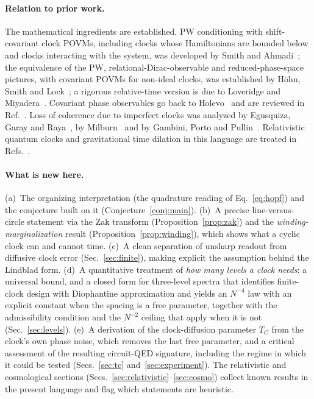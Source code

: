 \documentclass[aps,prd,onecolumn,notitlepage,10pt,amsmath,amssymb,amsfonts,nofootinbib]{revtex4-2}
\theoremstyle{definition}
\theoremstyle{remark}
\begin{document}
\paragraph*{Relation to prior work.}
The mathematical ingredients are established. PW conditioning with shift-covariant clock POVMs, including clocks whose Hamiltonians are bounded below and clocks interacting with the system, was developed by Smith and Ahmadi~\cite{SmithAhmadi2019}; the equivalence of the PW, relational-Dirac-observable and reduced-phase-space pictures, with covariant POVMs for non-ideal clocks, was established by H\"ohn, Smith and Lock~\cite{Hohn2021}; a rigorous relative-time version is due to Loveridge and Miyadera~\cite{LoveridgeMiyadera2019}. Covariant phase observables go back to Holevo~\cite{Holevo1982} and are reviewed in Ref.~\cite{BuschGrabowskiLahti1995}. Loss of coherence due to imperfect clocks was analyzed by Egusquiza, Garay and Raya~\cite{Egusquiza1999}, by Milburn~\cite{Milburn1991} and by Gambini, Porto and Pullin~\cite{Gambini2004}. Relativistic quantum clocks and gravitational time dilation in this language are treated in Refs.~\cite{Zych2011,Pikovski2015,CastroRuiz2017,SmithAhmadi2020}.

\paragraph*{What is new here.}
(a)~The organizing interpretation (the quadrature reading of Eq.~\eqref{eq:hopf}) and the conjecture built on it (Conjecture~\ref{conj:main}). (b)~A precise line-versus-circle statement via the Zak transform (Proposition~\ref{prop:zak}) and the \emph{winding-marginalization} result (Proposition~\ref{prop:winding}), which shows what a cyclic clock can and cannot time. (c)~A clean separation of unsharp readout from diffusive clock error (Sec.~\ref{sec:finite}), making explicit the assumption behind the Lindblad form. (d)~A quantitative treatment of {\em how many levels a clock needs}: a universal bound, and a closed form for three-level spectra that identifies finite-clock design with Diophantine approximation and yields an $N^{-4}$ law with an explicit constant when the spacing is a free parameter, together with the admissibility condition and the $N^{-2}$ ceiling that apply when it is not (Sec.~\ref{sec:levels}). (e)~A derivation of the clock-diffusion parameter $T_C$ from the clock's own phase noise, which removes the last free parameter, and a critical assessment of the resulting circuit-QED signature, including the regime in which it could be tested (Secs.~\ref{sec:tc} and~\ref{sec:experiment}). The relativistic and cosmological sections (Secs.~\ref{sec:relativistic}--\ref{sec:cosmo}) collect known results in the present language and flag which statements are heuristic.
\end{document}
